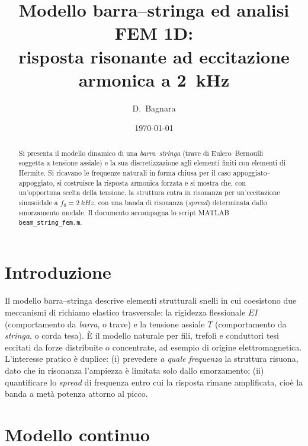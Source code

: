 \documentclass[11pt,a4paper]{article}
\title{Modello barra--stringa ed analisi FEM 1D:\\
risposta risonante ad eccitazione armonica a \SI{2}{kHz}}
\author{D.~Bagnara}
\date{\today}
\begin{document}
\maketitle

\begin{abstract}
Si presenta il modello dinamico di una \emph{barra--stringa} (trave di
Eulero--Bernoulli soggetta a tensione assiale) e la sua discretizzazione agli
elementi finiti con elementi di Hermite. Si ricavano le frequenze naturali in
forma chiusa per il caso appoggiato--appoggiato, si costruisce la risposta
armonica forzata e si mostra che, con un'opportuna scelta della tensione, la
struttura entra in risonanza per un'eccitazione sinusoidale a
$f_0 = \SI{2}{kHz}$, con una banda di risonanza (\emph{spread}) determinata
dallo smorzamento modale. Il documento accompagna lo script MATLAB
\texttt{beam\_string\_fem.m}.
\end{abstract}

\section{Introduzione}
Il modello barra--stringa descrive elementi strutturali snelli in cui
coesistono due meccanismi di richiamo elastico trasversale: la rigidezza
flessionale $EI$ (comportamento da \emph{barra}, o trave) e la tensione
assiale $T$ (comportamento da \emph{stringa}, o corda tesa). \`E il modello
naturale per fili, trefoli e conduttori tesi eccitati da forze distribuite o
concentrate, ad esempio di origine elettromagnetica. L'interesse pratico \`e
duplice: (i) prevedere \emph{a quale frequenza} la struttura risuona, dato che
in risonanza l'ampiezza \`e limitata solo dallo smorzamento; (ii) quantificare
lo \emph{spread} di frequenza entro cui la risposta rimane amplificata, cio\`e
la banda a met\`a potenza attorno al picco.

\section{Modello continuo}
\end{document}
